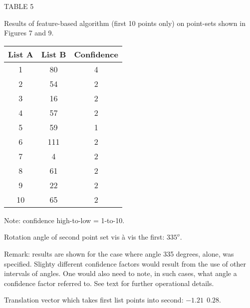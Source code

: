 \newpage 
\begin{table}
\begin{center}

TABLE 5

\smallskip

Results of feature-based algorithm (first 10 points only)  
on point-sets shown in Figures 7 and
9.

\bigskip

\bigskip

\bigskip

\begin{tabular}{c c c} \hline
List A  & List B & Confidence \\ \hline
       1   &   80  &     4  \\
       2   &   54  &     2  \\
       3   &   16  &     2  \\
       4   &   57  &     2  \\
       5   &   59  &     1  \\
       6   &  111  &     2   \\
       7   &    4  &     2   \\
       8   &   61  &     2   \\
       9   &   22  &     2   \\
      10   &   65  &     2   \\ \hline \hline 
\end{tabular}   


\medskip

Note: confidence high-to-low = 1-to-10.

\medskip

Rotation angle of second point set vis \`a vis the first: $335^o$.

\medskip

Remark: results are shown for the case where angle 335 degrees, alone, 
was specified.
Slighty different confidence factors would result from the use of other
intervals of angles.  One would also need to note, in such cases, what angle
a confidence factor referred to.  See text for further operational details.

\medskip

Translation vector which takes first list points into second: 
$       -1.21  \ \ 0.28$.

\medskip


\bigskip

\bigskip

\bigskip

\bigskip

\bigskip

\bigskip

\end{center}
\end{table}






\bye

